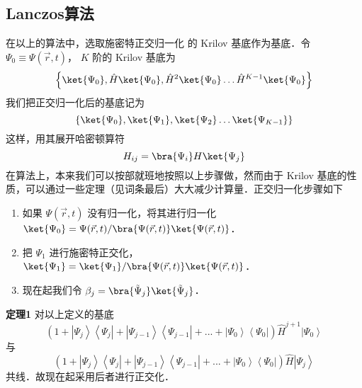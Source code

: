 \subsection{Lanczos算法}
在以上的算法中，选取施密特正交归一化 %
的 Krilov 基底作为基底．令 $\Psi_0 \equiv \Psi(\vec r, t)$，  $K$ 阶的 Krilov 基底为
 \begin{equation}
\left\{ \ket{\Psi_0}, \hat H \ket{\Psi_0}, \hat H^2 \ket{\Psi_0} \dots \hat H^{K-1} \ket{\Psi_0} \right\}
\end{equation}
我们把正交归一化后的基底记为
 \begin{equation}
\left\{ \ket{\Psi_0}, \ket{\Psi_1}, \ket{\Psi_2} \dots \ket{\Psi_{K-1}} \right\}
\end{equation}
这样，用其展开哈密顿算符
\begin{equation}
H_{ij}=\bra{\Psi_i} H \ket{\Psi_j}
\end{equation}
在算法上，本来我们可以按部就班地按照以上步骤做，然而由于 Krilov 基底的性质，可以通过一些定理（见词条最后）大大减少计算量．正交归一化步骤如下

\begin{enumerate}
\item 如果 $\Psi(\vec r,t)$ 没有归一化，将其进行归一化 $\ket{\Psi_0}=\Psi(\vec r,t)/\bra{\Psi(\vec r,t)}\ket{\Psi(\vec r,t)}$．
\item 把 $\Psi_1$ 进行施密特正交化， $\ket{\Psi_1}=\ket{\Psi_1}/\bra{\Psi(\vec r,t)}\ket{\Psi(\vec r,t)}$．  %
\item 现在起我们令 $\beta_j = \bra{\tilde\Psi_j}\ket{\tilde\Psi_j}$． %
\end{enumerate}

{\noindent \textbf{定理1}}
对以上定义的基底
\begin{equation}
\left( {1 + \left| {{\Psi _j}} \right\rangle \left\langle {{\Psi _j}} \right| + \left| {{\Psi _{j - 1}}} \right\rangle \left\langle {{\Psi _{j - 1}}} \right| + ... + \left| {{\Psi _0}} \right\rangle \left\langle {{\Psi _0}} \right|} \right){\hat H^{j + 1}}\left| {{\Psi _0}} \right\rangle
\end{equation}
与
\begin{equation}
\left( {1 + \left| {{\Psi _j}} \right\rangle \left\langle {{\Psi _j}} \right| + \left| {{\Psi _{j - 1}}} \right\rangle \left\langle {{\Psi _{j - 1}}} \right| + ... + \left| {{\Psi _0}} \right\rangle \left\langle {{\Psi _0}} \right|} \right)\hat H\left| {{\Psi _j}} \right\rangle 
\end{equation}
共线．故现在起采用后者进行正交化．

